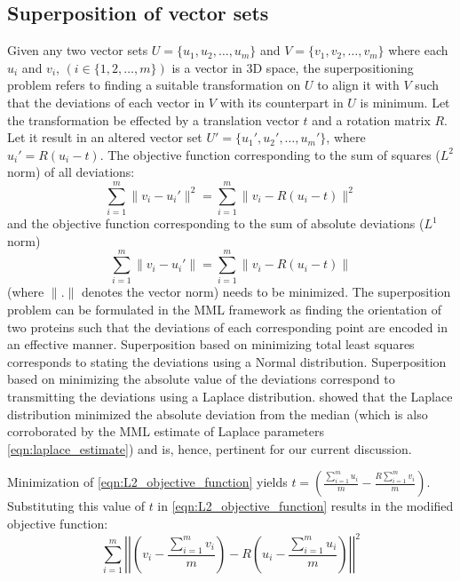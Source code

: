 \documentclass[wcp]{jmlr}
\begin{document}
\subsection{Superposition of vector sets}
Given any two vector sets $U = \{u_1,u_2,\ldots,u_m\}$ and $V = \{v_1,v_2,\ldots,v_m\}$
where each $u_i$ and $v_i$, $(i \in \{1,2,\ldots,m\})$ is a vector in 3D space, the 
superpositioning problem refers to finding a suitable transformation on $U$ to
align it with $V$ such that the deviations of each vector in $V$ with its counterpart
in $U$ is minimum. Let the transformation be effected by a translation vector $t$ and a rotation matrix $R$.
Let it result in an altered vector set $U'=\{u_1',u_2',\ldots,u_m'\}$, where $u_i'=R(u_i-t)$.
The objective function corresponding to the sum of squares ($L^2$ norm) of all deviations: 
\begin{equation} 
  \sum_{i=1}^m \|v_i-u_i'\|^2 = \sum_{i=1}^m \|v_i-R(u_i-t)\|^2 \label{eqn:L2_objective_function}
\end{equation} 
and the objective function corresponding to the sum of absolute deviations ($L^1$ norm)
\begin{equation} 
  \sum_{i=1}^m \|v_i-u_i'\| = \sum_{i=1}^m \|v_i-R(u_i-t)\| \label{eqn:L1_objective_function}
\end{equation}
(where $\|.\|$ denotes the vector norm) needs to be minimized. 
The superposition problem can be formulated in the MML framework as finding the 
orientation of two proteins such that the deviations of each corresponding point
are encoded in an effective manner. Superposition based on minimizing total least
squares corresponds to stating the deviations using a Normal distribution. 
Superposition based on minimizing the absolute value of the deviations correspond
to transmitting the deviations using a Laplace distribution. \citet{keynes-laplace} 
showed that the Laplace distribution minimized the absolute deviation from the median
(which is also corroborated by the MML estimate of Laplace parameters 
\eqref{eqn:laplace_estimate}) and is, hence, pertinent for our current discussion. 

Minimization of \eqref{eqn:L2_objective_function} yields $t = \left(\frac{\sum_{i=1}^m u_i}{m} - \frac{R\sum_{i=1}^m v_i}{m}\right)$.
Substituting this value of $t$ in \eqref{eqn:L2_objective_function} results in the modified objective function:
\begin{equation}
\sum_{i=1}^m \left|\left|\left(v_i - \frac{\sum_{i=1}^m v_i}{m}\right) - R \left(u_i - \frac{\sum_{i=1}^m u_i}{m}\right)\right|\right|^2 \label{eqn:L2_after_translation}
\end{equation} 
\end{document}
